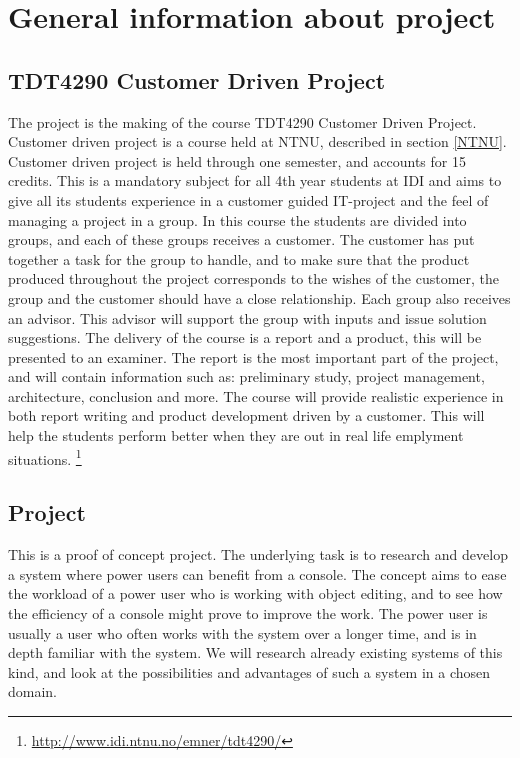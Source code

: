 \section{General information about project}

\subsection{TDT4290 Customer Driven Project}
The project is the making of the course TDT4290 Customer Driven Project. Customer driven project is a course held at NTNU, described in section \ref{NTNU}. Customer driven project is held through one semester, and accounts for 15 credits. This is a mandatory subject for all 4th year students at IDI and aims to give all its students experience in a customer guided IT-project and the feel of managing a project in a group. In this course the students are divided into groups, and each of these groups receives a customer. 
The customer has put together a task for the group to handle, and to make sure that the product produced throughout the project corresponds to the wishes of the customer, the group and the customer should have a close relationship. 
Each group also receives an advisor. This advisor will support the group with inputs and issue solution suggestions. 
The delivery of the course is a report and a product, this will be presented to an examiner. The report is the most important part of the project, and will contain information such as: preliminary study, project management, architecture, conclusion and more. 
The course will provide realistic experience in both report writing and product development driven by a customer. This will help the students perform better when they are out in real life emplyment situations.
\footnote{\url{http://www.idi.ntnu.no/emner/tdt4290/}}

\subsection{Project}
This is a proof of concept project. The underlying task is to research and develop a system where power users can benefit from a console.  The concept aims to ease the workload of a power user who is working with object editing, and to see how the efficiency of a console might prove to improve the work. The power user is usually a user who often works with the system over a longer time, and is in depth familiar with the system. We will research already existing systems of this kind, and look at the possibilities and advantages of such a system in a chosen domain.

